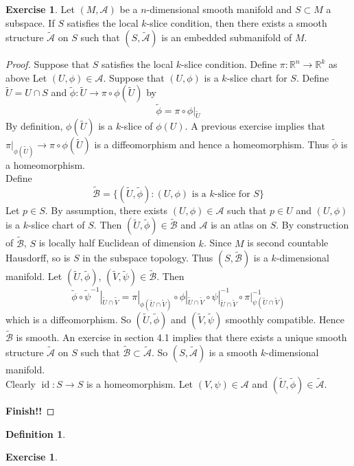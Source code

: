 \documentclass{book}
\theoremstyle{definition}
\newtheorem{defn}[definition]{Definition}
\newtheorem{ex}[definition]{Exercise}
\newcommand{\R}{\mathbb{R}}
\newcommand{\MA}{\mathcal{A}}
\newcommand{\MB}{\mathcal{B}}
\newcommand{\tMA}{\tilde{\MA}}
\newcommand{\tMB}{\tilde{\MB}}
\newcommand{\tU}{\tilde{U}}
\newcommand{\tV}{\tilde{V}}
\newcommand{\tphi}{\tilde{\phi}}
\newcommand{\tpsi}{\tilde{\psi}}
\DeclareMathOperator{\id}{id}
\DeclareMathOperator*{\0}{\mbf{0}}
\DeclareMathOperator*{\1}{\mbf{1}}
\newcommand{\tbf}[1]{\textbf{#1}}
\begin{document}
	\begin{ex}
	Let $(M, \MA)$ be a $n$-dimensional smooth manifold and $S \subset M$ a subspace. If $S$ satisfies the local $k$-slice condition, then there exists a smooth structure $\tMA$ on $S$ such that $(S, \tMA)$ is an embedded submanifold of $M$.
	\end{ex}	
	
	\begin{proof}
	Suppose that $S$ satisfies the local $k$-slice condition. Define $\pi: \R^n \rightarrow \R^k$ as above Let $(U, \phi) \in \MA$. Suppose that $(U, \phi)$ is a $k$-slice chart for $S$. Define $\tU = U \cap S$ and $\tphi: \tU \rightarrow \pi \circ \phi(\tU)$ by $$\tphi = \pi \circ \phi|_{\tU}$$ By definition, $\phi(\tU)$ is a $k$-slice of $\phi(U)$. A previous exercise implies that $\pi|_{\phi(\tU)} \rightarrow \pi \circ \phi(\tU)$ is a diffeomorphism and hence a homeomorphism. Thus $\tphi$ is a homeomorphism.\\
	Define $$\tMB = \{(\tU, \tphi): (U, \phi) \text{ is a $k$-slice for $S$} \}$$
	Let $p \in S$. By assumption, there exists $(U, \phi) \in \MA$ such that $p \in U$ and $(U, \phi)$ is a $k$-slice chart of $S$. Then $(\tU, \tphi) \in \tMB$ and $\MA$ is an atlas on $S$. By construction of $\tMB$, $S$ is locally half Euclidean of dimension $k$.  Since $M$ is second countable Hausdorff, so is $S$ in the subspace topology. Thus $(S, \tMB)$ is a $k$-dimensional manifold.
	Let $(\tU, \tphi)$, $(\tV, \tpsi) \in \tMB$. Then
	$$\tphi \circ \tpsi^{-1}|_{\tU \cap \tV} = \pi|_{\phi(\tU \cap \tV)} \circ \phi|_{\tU \cap \tV} \circ \psi|_{\tU \cap \tV}^{-1} \circ \pi|_{\psi(\tU \cap \tV)}^{-1} $$
	which is a diffeomorphism. So $(\tU, \tphi)$ and $(\tV, \tpsi)$ smoothly compatible. Hence $\tMB$ is smooth. An exercise in section 4.1 implies that there exists a unique smooth structure $\tMA$ on $S$ such that $\tMB \subset \tMA$. So $(S, \tMA)$ is a smooth $k$-dimensional manifold.\\
	Clearly $\id: S \rightarrow S$ is a homeomorphism. Let $(V, \psi) \in \MA$ and $(\tU, \tphi) \in \tMA$. 
	
	\tbf{Finish!!}
	\end{proof}
	
	
	
	
	\begin{defn}
	
	\end{defn}	
	
	\begin{ex}
	
	\end{ex}	
	
\end{document}

